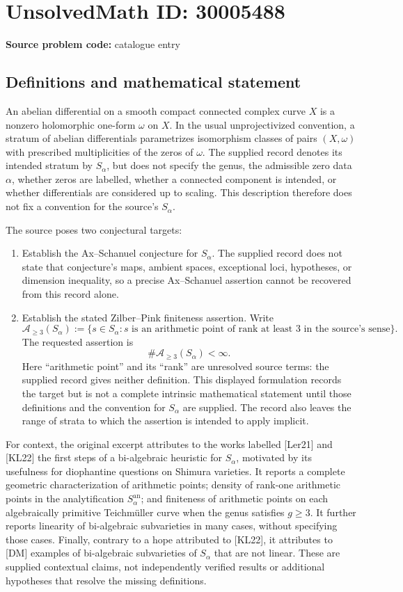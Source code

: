 \documentclass[11pt]{article}
\begin{document}
\section*{UnsolvedMath ID: 30005488}
\textbf{Source problem code:} catalogue entry
\subsection{Definitions and mathematical statement}
An abelian differential on a smooth compact connected complex curve \(X\) is a nonzero holomorphic one-form \(\omega\) on \(X\). In the usual unprojectivized convention, a stratum of abelian differentials parametrizes isomorphism classes of pairs \((X,\omega)\) with prescribed multiplicities of the zeros of \(\omega\). The supplied record denotes its intended stratum by \(S_\alpha\), but does not specify the genus, the admissible zero data \(\alpha\), whether zeros are labelled, whether a connected component is intended, or whether differentials are considered up to scaling. This description therefore does not fix a convention for the source's \(S_\alpha\).

The source poses two conjectural targets:
\begin{enumerate}
\item Establish the Ax--Schanuel conjecture for \(S_\alpha\). The supplied record does not state that conjecture's maps, ambient spaces, exceptional loci, hypotheses, or dimension inequality, so a precise Ax--Schanuel assertion cannot be recovered from this record alone.
\item Establish the stated Zilber--Pink finiteness assertion. Write
\[
\mathcal A_{\geq 3}(S_\alpha)
:=\{s\in S_\alpha : s\text{ is an arithmetic point of rank at least }3\text{ in the source's sense}\}.
\]
The requested assertion is
\[
\#\mathcal A_{\geq 3}(S_\alpha)<\infty.
\]
Here ``arithmetic point'' and its ``rank'' are unresolved source terms: the supplied record gives neither definition. This displayed formulation records the target but is not a complete intrinsic mathematical statement until those definitions and the convention for \(S_\alpha\) are supplied. The record also leaves the range of strata to which the assertion is intended to apply implicit.
\end{enumerate}

For context, the original excerpt attributes to the works labelled [Ler21] and [KL22] the first steps of a bi-algebraic heuristic for \(S_\alpha\), motivated by its usefulness for diophantine questions on Shimura varieties. It reports a complete geometric characterization of arithmetic points; density of rank-one arithmetic points in the analytification \(S_\alpha^{\mathrm{an}}\); and finiteness of arithmetic points on each algebraically primitive Teichm\"uller curve when the genus satisfies \(g\geq 3\). It further reports linearity of bi-algebraic subvarieties in many cases, without specifying those cases. Finally, contrary to a hope attributed to [KL22], it attributes to [DM] examples of bi-algebraic subvarieties of \(S_\alpha\) that are not linear. These are supplied contextual claims, not independently verified results or additional hypotheses that resolve the missing definitions.
\end{document}
